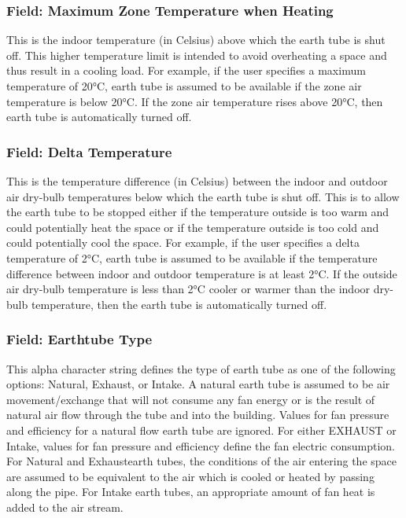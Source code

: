 \subsubsection{Field: Maximum Zone Temperature when Heating}\label{field-maximum-zone-temperature-when-heating}

This is the indoor temperature (in Celsius) above which the earth tube is shut off. This higher temperature limit is intended to avoid overheating a space and thus result in a cooling load. For example, if the user specifies a maximum temperature of 20°C, earth tube is assumed to be available if the zone air temperature is below 20°C. If the zone air temperature rises above 20°C, then earth tube is automatically turned off.

\subsubsection{Field: Delta Temperature}\label{field-delta-temperature-4}

This is the temperature difference (in Celsius) between the indoor and outdoor air dry-bulb temperatures below which the earth tube is shut off. This is to allow the earth tube to be stopped either if the temperature outside is too warm and could potentially heat the space or if the temperature outside is too cold and could potentially cool the space. For example, if the user specifies a delta temperature of 2°C, earth tube is assumed to be available if the temperature difference between indoor and outdoor temperature is at least 2°C. If the outside air dry-bulb temperature is less than 2°C cooler or warmer than the indoor dry-bulb temperature, then the earth tube is automatically turned off.

\subsubsection{Field: Earthtube Type}\label{field-earthtube-type}

This alpha character string defines the type of earth tube as one of the following options: Natural, Exhaust, or Intake. A natural earth tube is assumed to be air movement/exchange that will not consume any fan energy or is the result of natural air flow through the tube and into the building. Values for fan pressure and efficiency for a natural flow earth tube are ignored. For either EXHAUST or Intake, values for fan pressure and efficiency define the fan electric consumption. For Natural and Exhaustearth tubes, the conditions of the air entering the space are assumed to be equivalent to the air which is cooled or heated by passing along the pipe. For Intake earth tubes, an appropriate amount of fan heat is added to the air stream.


